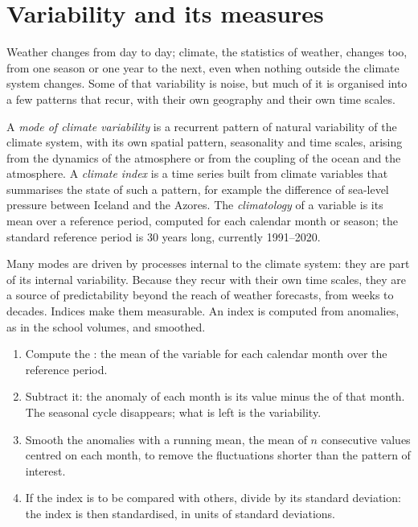 \section{Variability and its measures}\label{sec:b2:climate-variability:measures}

Weather changes from day to day; climate, the statistics of weather, changes too, from one season
or one year to the next, even when nothing outside the climate system changes. Some of that
variability is noise, but much of it is organised into a few patterns that recur, with their own
geography and their own time scales.

\begin{definition}\label{def:b2:climate-variability:modes}
A \emph{mode of climate variability} is a recurrent pattern of
natural variability of the climate system, with its own spatial pattern, seasonality and time
scales, arising from the dynamics of the atmosphere or from the coupling of the ocean and the
atmosphere. A \emph{climate index} is a time series built from climate
variables that summarises the state of such a pattern, for example the difference of sea-level
pressure between Iceland and the Azores. The \emph{climatology} of a variable
is its mean over a reference period, computed for each calendar month or season; the standard
reference period is 30 years long, currently 1991--2020.
\end{definition}

Many modes are driven by processes internal to the climate system: they are part of its
internal variability. Because they recur with their own time scales, they are a source of
predictability beyond the reach of weather forecasts, from weeks to decades. Indices make them
measurable. An index is computed from anomalies, as in the school volumes, and
smoothed.

\begin{method}\label{met:b2:climate-variability:index}
\begin{enumerate}
  \item Compute the : the mean of the variable for each calendar month over the
        reference period.
  \item Subtract it: the anomaly of each month is its value minus the  of that month.
        The seasonal cycle disappears; what is left is the variability.
  \item Smooth the anomalies with a running mean, the mean of $n$ consecutive values centred on
        each month, to remove the fluctuations shorter than the pattern of interest.
  \item If the index is to be compared with others, divide by its standard deviation: the index
        is then standardised, in units of standard deviations.
\end{enumerate}
\end{method}

